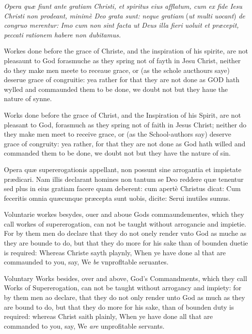 \emph{Opera quæ fiunt ante gratiam Christi, et spiritus eius afflatum, cum ex fide Iesu Christi non prodeant, minimè Deo grata sunt: neque gratiam }(\emph{ut multi uocant}) \emph{de congruo merentur: Imo cum non sint facta ut Deus illa fieri uoluit et præcepit, peccati rationem habere non dubitamus.}

Workes done before the grace of Christe, and the inspiration of his spirite, are not pleasaunt to God forasmuche as they spring not of fayth in Jesu Christ, neither do they make men meete to receaue grace, or (as the schole aucthours saye) deserue grace of congruitie: yea rather for that they are not done as GOD hath wylled and commaunded them to be done, we doubt not but they haue the nature of synne.

Works done before the grace of Christ, and the Inspiration of his Spirit, are not pleasant to God, forasmuch as they spring not of faith in Jesus Christ; neither do they make men meet to receive grace, or (as the School-authors say) deserve grace of congruity: yea rather, for that they are not done as God hath willed and commanded them to be done, we doubt not but they have the nature of sin.


Opera quæ supererogationis appellant, non possunt sine arrogantia et impietate prædicari. Nam illis declarant homines non tantum se Deo reddere quæ tenentur sed plus in eius gratiam facere quam deberent: cum apertè Christus dicat: Cum feceritis omnia quæcunque præcepta sunt uobis, dicite: Serui inutiles sumus.

Voluntarie workes besydes, ouer and aboue Gods commaundementes, which they call workes of supererogation, can not be taught without arrogancie and impietie. For by them men do declare that they do not onely render vnto God as muche as they are bounde to do, but that they do more for his sake than of bounden duetie is required: Whereas Christe sayth playnly, When ye have done al that are commaunded to you, say, We \emph{be} vnprofltable seruantes.

Voluntary Works besides, over and above, God's Commandments, which they call Works of Supererogation, can not be taught without arrogancy and impiety: for by them men ao declare, that they do not only render unto God as much as they are bound to do, but that they do more for his sake, than of bounden duty is required: whereas Christ saith plainly, When ye have done all that are commanded to you, say, We \emph{are} unprofitable servants.

